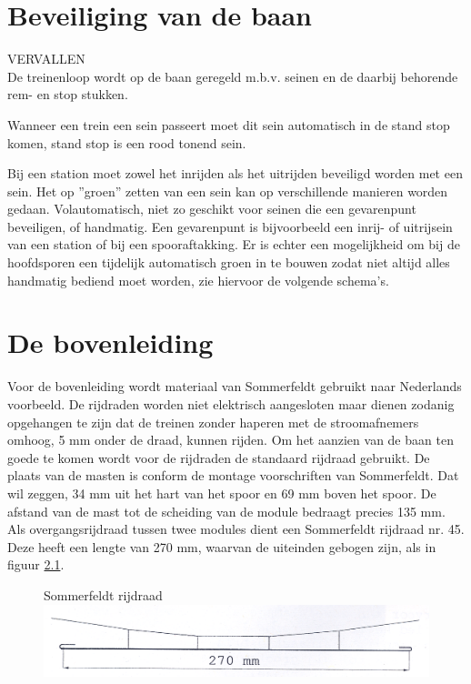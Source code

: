 \documentclass[12pt,a4paper]{report}
\begin{document}
\chapter{Beveiliging van de baan}
VERVALLEN
\\
De treinenloop wordt op de baan geregeld m.b.v. seinen en de daarbij behorende rem- en stop stukken.

Wanneer een trein een sein passeert moet dit sein automatisch in de stand stop komen,
stand stop is een rood tonend sein.

Bij een station moet zowel het inrijden als het uitrijden beveiligd worden met een sein. Het op ''groen'' zetten van een sein kan op verschillende manieren worden gedaan. Volautomatisch, niet zo geschikt voor seinen die een gevarenpunt beveiligen, of handmatig.
Een gevarenpunt is bijvoorbeeld een inrij- of uitrijsein van een station of bij een spooraftakking. Er is echter een mogelijkheid om bij de hoofdsporen een tijdelijk automatisch groen in te bouwen zodat niet altijd alles handmatig bediend moet worden, zie hiervoor de volgende schema's.

\chapter{De bovenleiding}

Voor de bovenleiding wordt materiaal van Sommerfeldt gebruikt naar Nederlands voorbeeld. 
De rijdraden worden niet elektrisch aangesloten maar dienen zodanig opgehangen te zijn dat de treinen zonder haperen met de stroomafnemers omhoog, 5 mm onder de draad, kunnen rijden. Om het aanzien van de baan ten goede te komen wordt voor de rijdraden de standaard rijdraad gebruikt. De plaats van de masten is conform de montage voorschriften van Sommerfeldt. Dat wil zeggen, 34 mm uit het hart van het spoor en 69 mm boven het spoor. De afstand van de mast tot de scheiding van de module bedraagt precies 135 mm. Als overgangsrijdraad tussen twee modules dient een Sommerfeldt rijdraad nr. 45. Deze heeft een lengte van 270 mm, waarvan de uiteinden gebogen zijn, als in figuur \ref{figuur9}.

\begin{figure}[ht]
  \captionbox
  {Sommerfeldt rijdraad\label{figuur9}}
  {\includegraphics[scale=1.0]{images/rcu_figuur9}}
\end{figure}
\end{document}
